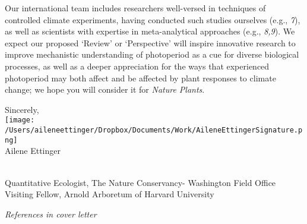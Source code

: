 \documentclass[10.5pt,a4paper]{letter}
\begin{document}
\begin{letter}{}
\par Our international team includes researchers well-versed in techniques of controlled climate experiments, having conducted such studies ourselves (e.g., \emph{7}), as well as scientists with expertise in meta-analytical approaches (e.g., \emph{8,9}). We expect our proposed `Review' or `Perspective' will inspire innovative research to
improve mechanistic understanding of photoperiod as a cue for diverse biological processes, as well as a deeper appreciation for the ways that experienced photoperiod may both affect and be affected by plant responses to climate change; we hope you will consider it for \emph{Nature Plants}.

\par Sincerely,\\

\texttt{[image: /Users/aileneettinger/Dropbox/Documents/Work/AileneEttingerSignature.png]} \\
Ailene Ettinger
\begin{footnotesize}\\
Quantitative Ecologist, The Nature Conservancy- Washington Field Office\\
Visiting Fellow, Arnold Arboretum of Harvard University 
\end{footnotesize}
 
 \noindent \emph{References in cover letter}


\end{letter}
\end{document}
